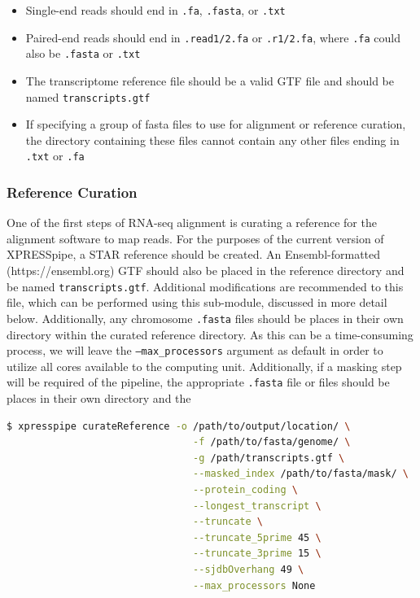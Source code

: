 \documentclass[11pt, a4paper, oneside]{article}
\begin{document}
\begin{itemize}
\item Single-end reads should end in \texttt{.fa}, \texttt{.fasta}, or \texttt{.txt}
\item Paired-end reads should end in \texttt{.read1/2.fa} or \texttt{.r1/2.fa}, where \texttt{.fa} could also be \texttt{.fasta} or \texttt{.txt}
\item The transcriptome reference file should be a valid GTF file and should be named \texttt{transcripts.gtf}
\item If specifying a group of fasta files to use for alignment or reference curation, the directory containing these files cannot contain any other files ending in \texttt{.txt} or \texttt{.fa}
\end{itemize}

\subsubsection{Reference Curation}
One of the first steps of RNA-seq alignment is curating a reference for the alignment software to map reads. For the purposes of the current version of XPRESSpipe, a STAR \cite{star} reference should be created. An Ensembl-formatted (https://ensembl.org) GTF should also be placed in the reference directory and be named \texttt{transcripts.gtf}. Additional modifications are recommended to this file, which can be performed using this sub-module, discussed in more detail below. Additionally, any chromosome \texttt{.fasta} files should be places in their own directory within the curated reference directory. As this can be a time-consuming process, we will leave the \texttt{--max\_processors} argument as default in order to utilize all cores available to the computing unit. Additionally, if a masking step will be required of the pipeline, the appropriate \texttt{.fasta} file or files should be places in their own directory and the
\newline
\begin{lstlisting}[language=bash, caption=curateReference example]
$ xpresspipe curateReference -o /path/to/output/location/ \
                                -f /path/to/fasta/genome/ \
                                -g /path/transcripts.gtf \
                                --masked_index /path/to/fasta/mask/ \
                                --protein_coding \
                                --longest_transcript \
                                --truncate \
                                --truncate_5prime 45 \
                                --truncate_3prime 15 \
                                --sjdbOverhang 49 \
                                --max_processors None
\end{lstlisting}
\end{document}
